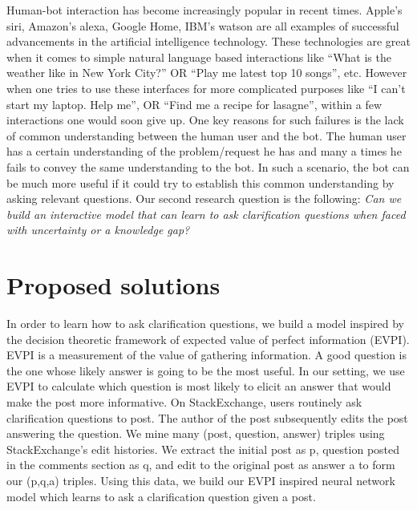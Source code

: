 \documentclass[11pt]{report}
\begin{document}
\noindent
Human-bot interaction has become increasingly popular in recent times. Apple's siri, Amazon's alexa, Google Home, IBM's watson are all examples of successful advancements in the artificial intelligence technology. These technologies are great when it comes to simple natural language based interactions like ``What is the weather like in New York City?'' OR ``Play me latest top 10 songs'', etc. However when one tries to use these interfaces for more complicated purposes like ``I can't start my laptop. Help me\!'', OR ``Find me a recipe for lasagne'', within a few interactions one would soon give up. One key reasons for such failures is the lack of common understanding between the human user and the bot. The human user has a certain understanding of the problem/request he has and many a times he fails to convey the same understanding to the bot. In such a scenario, the bot can be much more useful if it could try to establish this common understanding by asking relevant questions. Our second research question is the following: \textit{Can we build an interactive model that can learn to ask clarification questions when faced with uncertainty or a knowledge gap?}\\

\noindent

\section{Proposed solutions}

In order to learn how to ask clarification questions, we build a model inspired by the decision theoretic framework of expected value of perfect information (EVPI). EVPI is a measurement of the value of gathering information. A good question is the one whose likely answer is going to be the most useful. In our setting, we use EVPI to calculate which question is most likely to elicit an answer that would make the post more informative. On StackExchange, users routinely ask clarification questions to post. The author of the post subsequently edits the post answering the question. We mine many (post, question, answer) triples using StackExchange's edit histories. We extract the initial post as p, question posted in the comments section as q, and edit to the original post as answer a to form our (p,q,a) triples. Using this data, we build our EVPI inspired neural network model which learns to ask a clarification question given a post.\\
\end{document}
